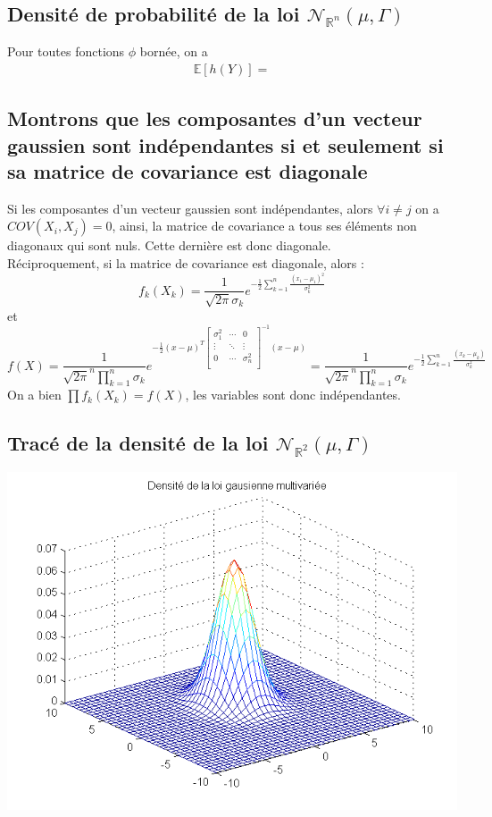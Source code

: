 \documentclass{report}
\begin{document}
		\subsection{Densité de probabilité de la loi $\mathcal{N}_{\mathbb{R}^n}(\mu, \Gamma)$}
			Pour toutes fonctions $\phi$ bornée, on a
			\begin{align*}
				\mathbb{E}[h(Y)] = 
			\end{align*}
		\subsection{Montrons que les composantes d'un vecteur gaussien sont indépendantes si et seulement si sa matrice de covariance est diagonale}
			Si les composantes d'un vecteur gaussien sont indépendantes, alors $\forall i \neq j$ on a $COV(X_i, X_j) = 0$, ainsi, la matrice de covariance a tous ses éléments non diagonaux qui sont nuls. Cette dernière est donc diagonale.\\
			Réciproquement, si la matrice de covariance est diagonale, alors :
			\[ f_k(X_k) = \frac{1}{\sqrt{2\pi}\sigma_k}e^{-\frac{1}{2}\sum\limits_{k=1}^{n}\frac{(x_1 - \mu_1)^2}{\sigma_k^2}} \]
			et
			\[f(X) = \frac{1}{\sqrt{2\pi}^n\prod\limits_{k=1}^{n}\sigma_k}e^{-\frac{1}{2}(x-\mu)^T\left[ 
				\begin{array}{ccc} 
					\sigma_1^2 & \cdots & 0 \\
					\vdots & \ddots & \vdots \\
					0 & \cdots & \sigma_n^2 \\
				\end{array} 
			\right]^{-1}(x-\mu)} = \frac{1}{\sqrt{2\pi}^n\prod\limits_{k=1}^{n}\sigma_k}e^{-\frac{1}{2}\sum\limits_{k=1}^{n}\frac{(x_k - \mu_k)}{\sigma_k^2}} \]
			On a bien $\prod\limits f_k(X_k) = f(X)$, les variables sont donc indépendantes.

		\subsection{Tracé de la densité de la loi $\mathcal{N}_{\mathbb{R}^2}(\mu, \Gamma)$}
			\includegraphics[scale=0.7]{sources/Q222-1.png}
\end{document}
